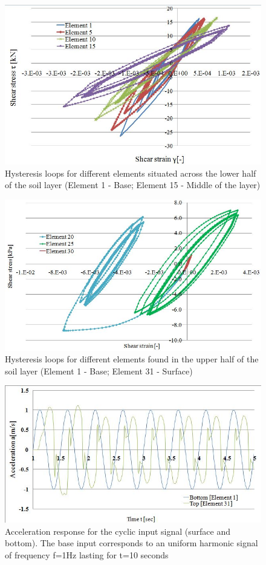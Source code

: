 	\begin{figure}[h!]
		\centering
		\includegraphics[width=0.7\linewidth]{"response1"}
		\caption[]{Hysteresis loops for different elements situated across the lower half of the soil layer (Element 1 - Base; Element 15 - Middle of the layer)}
		\label{response1}
	\end{figure}
	
	\begin{figure}[h!]
		\centering
		\includegraphics[width=0.7\linewidth]{"response2"}
		\caption[]{Hysteresis loops for different elements found in the upper half of the soil layer (Element 1 - Base; Element 31 - Surface)}
		\label{response2}
	\end{figure}
	
	\begin{figure}[h!]
		\centering
		\includegraphics[width=0.6\linewidth]{"acc_response1"}
		\caption{Acceleration response for the cyclic input signal (surface and bottom). The base input corresponds to an uniform harmonic signal of frequency f=1Hz lasting for t=10 seconds}
		\label{acc1}
	\end{figure}
	
